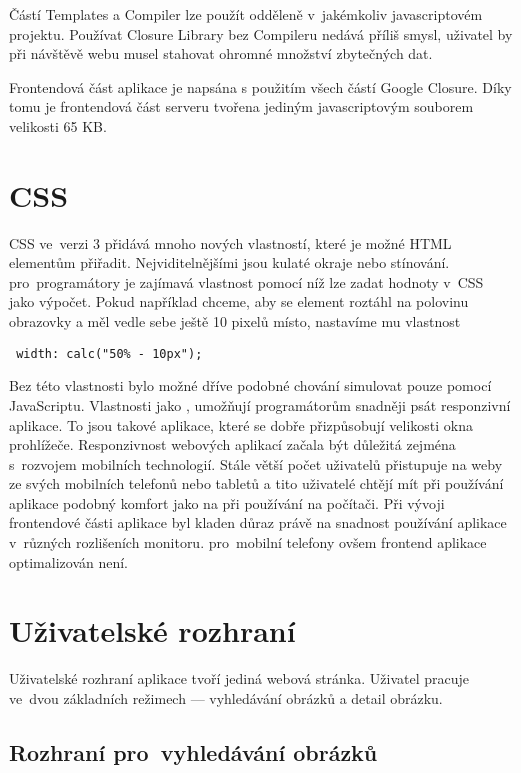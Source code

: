 Částí Templates a Compiler lze použít odděleně v~jakémkoliv javascriptovém projektu. Používat Closure Library bez Compileru nedává příliš smysl, uživatel by při návštěvě webu musel stahovat ohromné množství zbytečných dat.

Frontendová část aplikace je napsána s použitím všech částí Google Closure. Díky tomu je frontendová část serveru tvořena jediným javascriptovým souborem velikosti 65 KB.

\section{CSS}

CSS ve~verzi 3 přidává mnoho nových vlastností, které je možné HTML elementům přiřadit. Nejviditelnějšími jsou kulaté okraje nebo stínování. pro~programátory je zajímavá vlastnost  pomocí níž lze zadat hodnoty v~CSS jako výpočet. Pokud například chceme, aby se element roztáhl na polovinu obrazovky a měl vedle sebe ještě 10 pixelů místo, nastavíme mu vlastnost

\begin{lstlisting}
 width: calc("50% - 10px");
\end{lstlisting}

Bez této vlastnosti bylo možné dříve podobné chování simulovat pouze pomocí JavaScriptu. Vlastnosti jako , umožňují programátorům snadněji psát responzivní aplikace. To jsou takové aplikace, které se dobře přizpůsobují velikosti okna prohlížeče. Responzivnost webových aplikací začala být důležitá zejména s~rozvojem mobilních technologií. Stále větší počet uživatelů přistupuje na weby ze svých mobilních telefonů nebo tabletů a tito uživatelé chtějí mít při používání aplikace podobný komfort jako na při používání na počítači. Při vývoji frontendové části aplikace byl kladen důraz právě na snadnost používání aplikace v~různých rozlišeních monitoru. pro~mobilní telefony ovšem frontend aplikace optimalizován není. 

\section{Uživatelské rozhraní}

Uživatelské rozhraní aplikace tvoří jediná webová stránka. Uživatel pracuje ve~dvou základních režimech --- vyhledávání obrázků a detail obrázku.

\subsection{Rozhraní pro~vyhledávání obrázků}

